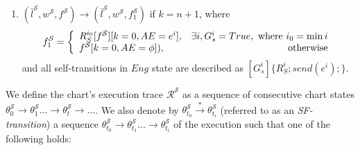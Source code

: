 \begin{definition}
\begin{enumerate}
\item $(\bar{l}^\mathcal{S},w^\mathcal{S},f^\mathcal{S})\rightarrow (\bar{l}^\mathcal{S},w^\mathcal{S},f^\mathcal{S}_1)$ if $k=n+1$, where
\begin{equation*}
f^\mathcal{S}_1= \left\{
\begin{array}{lr} 
R_S^{i_0}[f^\mathcal{S}][k=0,AE=e^i], & \exists i, G_s^i=True, \hbox{ where } i_0=\min i\\
f^\mathcal{S}[k=0,AE=\phi]), & \hbox{otherwise}
\end{array}
\right.
\end{equation*}
and all self-transitions in $Eng$ state are described as $[G_s^i]\{R_S^i;send(e^i);\}$. 
\end{enumerate}

\end{definition}


We define the chart's execution trace $\mathcal{R}^\mathcal{S}$ as a sequence of consecutive chart states $\theta^\mathcal{S}_0\rightarrow\theta^\mathcal{S}_1\ldots\rightarrow\theta^\mathcal{S}_t\rightarrow\dots$. 
We also denote by $\theta^\mathcal{S}_{t_0}\xrightarrow{*}\theta^\mathcal{S}_{t_i}$ (referred to as an \textit{SF-transition}) a sequence  $\theta^\mathcal{S}_{t_0}\rightarrow\theta^\mathcal{S}_{t_1}\ldots\rightarrow\theta^\mathcal{S}_{t_i}$ of the execution such that one of the following holds:

